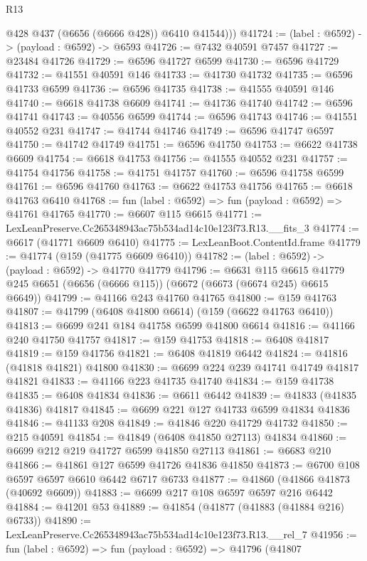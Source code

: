 \begin{lexlean}{R13}
\begin{coremodule}
          @428
          @437
          (@6656 (@6666 @428))
          @6410
          @41544)))
@41724 := (label : @6592) -> (payload : @6592) -> @6593
@41726 := @7432 @40591 @7457
@41727 := @23484 @41726
@41729 := @6596 @41727 @6599
@41730 := @6596 @41729
@41732 := @41551 @40591 @146
@41733 := @41730 @41732
@41735 := @6596 @41733 @6599
@41736 := @6596 @41735
@41738 := @41555 @40591 @146
@41740 := @6618 @41738 @6609
@41741 := @41736 @41740
@41742 := @6596 @41741
@41743 := @40556 @6599
@41744 := @6596 @41743
@41746 := @41551 @40552 @231
@41747 := @41744 @41746
@41749 := @6596 @41747 @6597
@41750 := @41742 @41749
@41751 := @6596 @41750
@41753 := @6622 @41738 @6609
@41754 := @6618 @41753
@41756 := @41555 @40552 @231
@41757 := @41754 @41756
@41758 := @41751 @41757
@41760 := @6596 @41758 @6599
@41761 := @6596 @41760
@41763 := @6622 @41753 @41756
@41765 := @6618 @41763 @6410
@41768 := fun (label : @6592) => fun (payload : @6592) => @41761 @41765
@41770 := @6607 @115 @6615
@41771 := LexLeanPreserve.Cc265348943ac75b534ad14c10e123f73.R13.__fits_3
@41774 := @6617 (@41771 @6609 @6410)
@41775 := LexLeanBoot.ContentId.frame
@41779 := @41774 (@159 (@41775 @6609 @6410))
@41782 := (label : @6592) -> (payload : @6592) -> @41770 @41779
@41796 := @6631
    @115
    @6615
    @41779
    @245
    @6651
    (@6656 (@6666 @115))
    (@6672 (@6673 (@6674 @245) @6615 @6649))
@41799 := @41166 @243 @41760 @41765
@41800 := @159 @41763
@41807 := @41799 (@6408 @41800 @6614) (@159 (@6622 @41763 @6410))
@41813 := @6699 @241 @184 @41758 @6599 @41800 @6614
@41816 := @41166 @240 @41750 @41757
@41817 := @159 @41753
@41818 := @6408 @41817
@41819 := @159 @41756
@41821 := @6408 @41819 @6442
@41824 := @41816 (@41818 @41821) @41800
@41830 := @6699 @224 @239 @41741 @41749 @41817 @41821
@41833 := @41166 @223 @41735 @41740
@41834 := @159 @41738
@41835 := @6408 @41834
@41836 := @6611 @6442
@41839 := @41833 (@41835 @41836) @41817
@41845 := @6699 @221 @127 @41733 @6599 @41834 @41836
@41846 := @41133 @208
@41849 := @41846 @220 @41729 @41732
@41850 := @215 @40591
@41854 := @41849 (@6408 @41850 @27113) @41834
@41860 := @6699 @212 @219 @41727 @6599 @41850 @27113
@41861 := @6683 @210
@41866 := @41861 @127 @6599 @41726 @41836 @41850
@41873 := @6700 @108 @6597 @6597 @6610 @6442 @6717 @6733
@41877 := @41860 (@41866 @41873 (@40692 @6609))
@41883 := @6699 @217 @108 @6597 @6597 @216 @6442
@41884 := @41201 @53
@41889 := @41854 (@41877 (@41883 (@41884 @216) @6733))
@41890 := LexLeanPreserve.Cc265348943ac75b534ad14c10e123f73.R13.__rel_7
@41956 := fun (label : @6592) =>
  fun (payload : @6592) =>
  @41796
    (@41807

\end{coremodule}
\end{lexlean}
